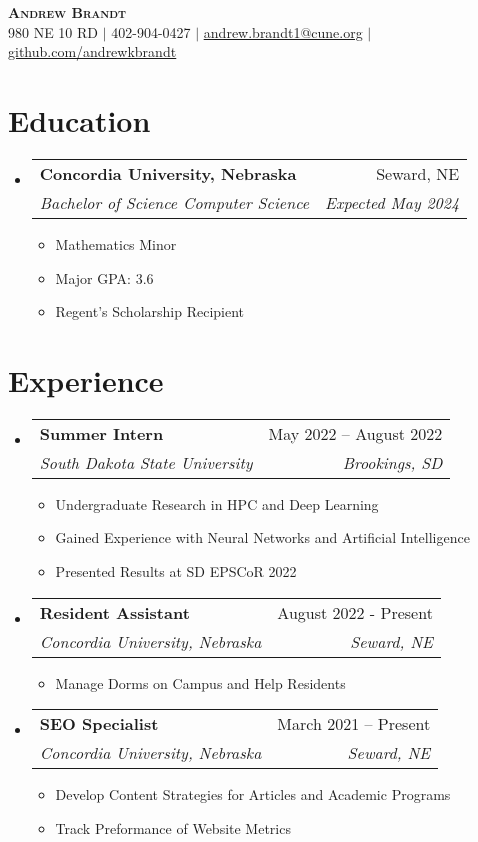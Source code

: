 \documentclass[letterpaper,11pt]{article}
\makeatletter
\newcommand{\resumeItem}[1]{
  \item\small{
    {#1 \vspace{-2pt}}
  }
}
\newcommand{\resumeSubheading}[4]{
  \vspace{-2pt}\item
    \begin{tabular*}{0.97\textwidth}[t]{l@{\extracolsep{\fill}}r}
      \textbf{#1} & #2 \\
      \textit{\small#3} & \textit{\small #4} \\
    \end{tabular*}\vspace{-7pt}
}
\newcommand{\resumeSubHeadingListStart}{\begin{itemize}[leftmargin=0.15in, label={}]}
\newcommand{\resumeSubHeadingListEnd}{\end{itemize}}
\newcommand{\resumeItemListStart}{\begin{itemize}}
\newcommand{\resumeItemListEnd}{\end{itemize}\vspace{-5pt}}
\makeatother
\begin{document}


\begin{center}
  \textbf{\Huge \scshape Andrew Brandt} \\ \vspace{1pt}
  \small 980 NE 10 RD $|$ \small 402-904-0427 $|$
  \href{mailto:andrew.brandt1@cune.org}{\underline{andrew.brandt1@cune.org}} $|$
  \href{https://github.com/andrewkbrandt}{\underline{github.com/andrewkbrandt}}
\end{center}


\section{Education}
\resumeSubHeadingListStart
\resumeSubheading
{Concordia University, Nebraska}{Seward, NE}
{Bachelor of Science Computer Science}{Expected May 2024}
\resumeItemListStart
\resumeItem{Mathematics Minor}
\resumeItem{Major GPA: 3.6}
\resumeItem{Regent's Scholarship Recipient}

\resumeItemListEnd




\resumeSubHeadingListEnd
\hspace{5mm}
\section{Experience}
\resumeSubHeadingListStart

\resumeSubheading
{Summer Intern}{May 2022 – August 2022}
{South Dakota State University}{Brookings, SD}
\resumeItemListStart
\resumeItem{Undergraduate Research in HPC and Deep Learning}
\resumeItem{Gained Experience with Neural Networks and Artificial Intelligence}
\resumeItem{Presented Results at SD EPSCoR 2022}
\resumeItemListEnd

\resumeSubheading
{Resident Assistant}{August 2022 - Present}
{Concordia University, Nebraska}{Seward, NE}
\resumeItemListStart
\resumeItem{Manage Dorms on Campus and Help Residents}
\resumeItemListEnd

\resumeSubheading
{SEO Specialist}{March 2021 – Present}
{Concordia University, Nebraska}{Seward, NE}
\resumeItemListStart
\resumeItem{Develop Content Strategies for Articles and Academic Programs}
\resumeItem{Track Preformance of Website Metrics}
\resumeItemListEnd


\resumeSubHeadingListEnd

\hspace{5mm}
\end{document}
